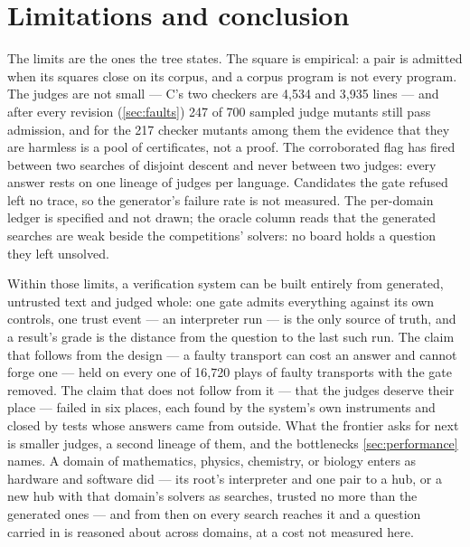 
\section{Limitations and conclusion}
\label{sec:conclusion}

The limits are the ones the tree states. The square is empirical: a
pair is admitted when its squares close on its corpus, and a corpus
program is not every program. The judges are not small ---
C's two checkers are 4,534 and 3,935 lines --- and after every
revision (\cref{sec:faults}) 247
of 700 sampled judge mutants still pass admission, and for the 217
checker mutants among them the evidence that they are harmless is a
pool of certificates, not a proof. The corroborated flag has fired
between two searches of disjoint descent and never between two
judges: every answer rests on one lineage of judges per language. Candidates the gate refused left no trace, so the
generator's failure rate is not measured. The per-domain ledger is
specified and not drawn; the oracle column reads that the generated
searches are weak beside the competitions' solvers: no board holds a
question they left unsolved.

Within those limits, a verification system
can be built entirely from generated, untrusted text and judged
whole: one gate admits everything against its own controls, one trust
event --- an interpreter run --- is the only source of truth, and a
result's grade is the distance from the question to the last such
run. The claim that follows from the design --- a
faulty transport can cost an answer and cannot forge one --- held on
every one of 16,720 plays of faulty transports with the gate removed.
The claim that does not follow from it --- that the judges deserve
their place --- failed in six places, each found by the system's own
instruments and closed by tests whose answers came from outside. What
the frontier asks for next is smaller judges, a second lineage of
them, and the bottlenecks \cref{sec:performance} names. A domain of
mathematics, physics, chemistry, or biology enters as hardware and
software did --- its root's interpreter and one pair to a hub,
or a new hub with that domain's solvers as searches, trusted no more
than the generated ones --- and from then on every search reaches it
and a question carried in is reasoned about across domains, at a
cost not measured here.
